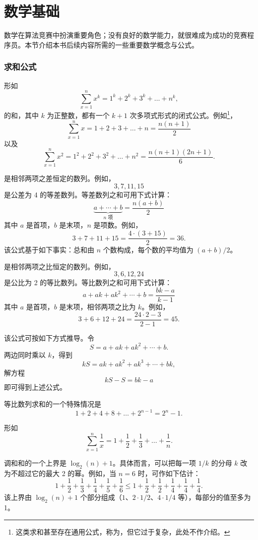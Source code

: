 \section{数学基础}

数学在算法竞赛中扮演重要角色；没有良好的数学能力，就很难成为成功的竞赛程序员。本节介绍本书后续内容所需的一些重要数学概念与公式。

\subsubsection{求和公式}

形如
\[\sum_{x=1}^n x^k = 1^k+2^k+3^k+\ldots+n^k,\]
的和，其中 $k$ 为正整数，都有一个 $k+1$ 次多项式形式的闭式公式。例如\footnote{这类求和甚至存在通用公式，称为，但它过于复杂，此处不作介绍。}，
\[\sum_{x=1}^n x = 1+2+3+\ldots+n = \frac{n(n+1)}{2}\]
以及
\[\sum_{x=1}^n x^2 = 1^2+2^2+3^2+\ldots+n^2 = \frac{n(n+1)(2n+1)}{6}.\]

是相邻两项之差恒定的数列。例如，
\[3, 7, 11, 15\]
是公差为 4 的等差数列。等差数列之和可用下式计算：
\[\underbrace{a + \cdots + b}_{n \,\, \textrm{项}} = \frac{n(a+b)}{2}\]
其中 $a$ 是首项，$b$ 是末项，$n$ 是项数。例如，
\[3+7+11+15=\frac{4 \cdot (3+15)}{2} = 36.\]
该公式基于如下事实：总和由 $n$ 个数构成，每个数的平均值为 $(a+b)/2$。

是相邻两项之比恒定的数列。例如，
\[3,6,12,24\]
是公比为 2 的等比数列。等比数列之和可用下式计算：
\[a + ak + ak^2 + \cdots + b = \frac{bk-a}{k-1}\]
其中 $a$ 是首项，$b$ 是末项，相邻两项之比为 $k$。例如，
\[3+6+12+24=\frac{24 \cdot 2 - 3}{2-1} = 45.\]

该公式可按如下方式推导。令
\[ S = a + ak + ak^2 + \cdots + b .\]
两边同时乘以 $k$，得到
\[ kS = ak + ak^2 + ak^3 + \cdots + bk,\]
解方程
\[ kS-S = bk-a\]
即可得到上述公式。

等比数列求和的一个特殊情况是
\[1+2+4+8+\ldots+2^{n-1}=2^n-1.\]


形如
\[ \sum_{x=1}^n \frac{1}{x} = 1+\frac{1}{2}+\frac{1}{3}+\ldots+\frac{1}{n}.\]

调和和的一个上界是 $\log_2(n)+1$。具体而言，可以把每一项 $1/k$ 的分母 $k$ 改为不超过它的最大 2 的幂。例如，当 $n=6$ 时，可作如下估计：
\[ 1+\frac{1}{2}+\frac{1}{3}+\frac{1}{4}+\frac{1}{5}+\frac{1}{6} \le
1+\frac{1}{2}+\frac{1}{2}+\frac{1}{4}+\frac{1}{4}+\frac{1}{4}.\]
该上界由 $\log_2(n)+1$ 个部分组成（$1$、$2 \cdot 1/2$、$4 \cdot 1/4$ 等），每部分的值至多为 1。

